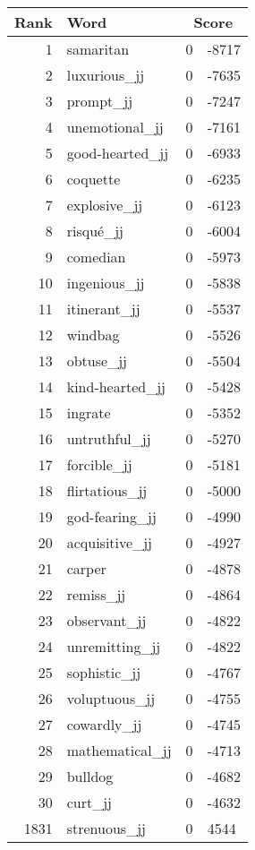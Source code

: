 \begin{longtable}[!htbp]{| rlr@{.}l |}
    \hline
    \textbf{Rank} & \textbf{Word} & \multicolumn{2}{c|}{\textbf{Score}} \\
    \hline
    \endhead
    1 & samaritan & 0 & -8717 \\
    2 & luxurious\_jj & 0 & -7635 \\
    3 & prompt\_jj & 0 & -7247 \\
    4 & unemotional\_jj & 0 & -7161 \\
    5 & good-hearted\_jj & 0 & -6933 \\
    6 & coquette & 0 & -6235 \\
    7 & explosive\_jj & 0 & -6123 \\
    8 & risqué\_jj & 0 & -6004 \\
    9 & comedian & 0 & -5973 \\
    10 & ingenious\_jj & 0 & -5838 \\
    11 & itinerant\_jj & 0 & -5537 \\
    12 & windbag & 0 & -5526 \\
    13 & obtuse\_jj & 0 & -5504 \\
    14 & kind-hearted\_jj & 0 & -5428 \\
    15 & ingrate & 0 & -5352 \\
    16 & untruthful\_jj & 0 & -5270 \\
    17 & forcible\_jj & 0 & -5181 \\
    18 & flirtatious\_jj & 0 & -5000 \\
    19 & god-fearing\_jj & 0 & -4990 \\
    20 & acquisitive\_jj & 0 & -4927 \\
    21 & carper & 0 & -4878 \\
    22 & remiss\_jj & 0 & -4864 \\
    23 & observant\_jj & 0 & -4822 \\
    24 & unremitting\_jj & 0 & -4822 \\
    25 & sophistic\_jj & 0 & -4767 \\
    26 & voluptuous\_jj & 0 & -4755 \\
    27 & cowardly\_jj & 0 & -4745 \\
    28 & mathematical\_jj & 0 & -4713 \\
    29 & bulldog & 0 & -4682 \\
    30 & curt\_jj & 0 & -4632 \\
    1831 & strenuous\_jj & 0 & 4544 \\

\end{longtable}
